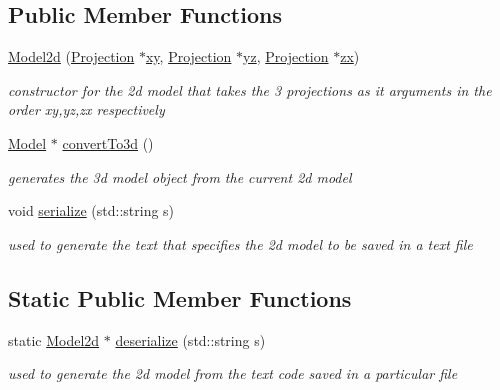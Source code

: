 \subsection*{Public Member Functions}
\begin{DoxyCompactItemize}
\item 
\mbox{\hyperlink{class_model2d_aa07204b20301739146f8ecf525778720}{Model2d}} (\mbox{\hyperlink{class_projection}{Projection}} $\ast$\mbox{\hyperlink{class_model2d_ad335c0d9899b23996a3f11e61be1d431}{xy}}, \mbox{\hyperlink{class_projection}{Projection}} $\ast$\mbox{\hyperlink{class_model2d_a4d012de876b8bb089bd226e41270df25}{yz}}, \mbox{\hyperlink{class_projection}{Projection}} $\ast$\mbox{\hyperlink{class_model2d_a6c459c26e4c89bbc11ac0149ea07b997}{zx}})
\begin{DoxyCompactList}\small\item\em constructor for the 2d model that takes the 3 projections as it arguments in the order xy,yz,zx respectively \end{DoxyCompactList}\item 
\mbox{\hyperlink{class_model}{Model}} $\ast$ \mbox{\hyperlink{class_model2d_ab39a4f4a2c6430cee2b226a9509ec38b}{convert\+To3d}} ()
\begin{DoxyCompactList}\small\item\em generates the 3d model object from the current 2d model \end{DoxyCompactList}\item 
void \mbox{\hyperlink{class_model2d_a9dbe9eafd94b347c3257ac90e743065c}{serialize}} (std\+::string s)
\begin{DoxyCompactList}\small\item\em used to generate the text that specifies the 2d model to be saved in a text file \end{DoxyCompactList}\end{DoxyCompactItemize}
\subsection*{Static Public Member Functions}
\begin{DoxyCompactItemize}
\item 
static \mbox{\hyperlink{class_model2d}{Model2d}} $\ast$ \mbox{\hyperlink{class_model2d_aa3c8399ef5cf86bb176b111c132f30b7}{deserialize}} (std\+::string s)
\begin{DoxyCompactList}\small\item\em used to generate the 2d model from the text code saved in a particular file \end{DoxyCompactList}\end{DoxyCompactItemize}
